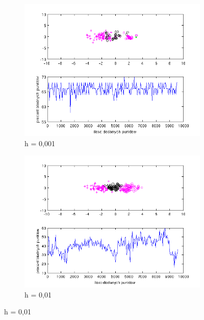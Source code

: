 \documentclass[10pt,a4paper]{article}
\begin{document}
\begin{figure}[H]

   \begin{subfigure}[b]{0.5\textwidth}
    \includegraphics[width=\textwidth]{test4_h0_001_66_00.png}
    \caption{h = 0,001}
  \end{subfigure}
  \hfill
  \begin{subfigure}[b]{0.5\textwidth}
    \includegraphics[width=\textwidth]{test4_h0_01_40_42.png}
    \caption{h = 0,01}
  \end{subfigure}
  

\end{figure}
\end{document}
